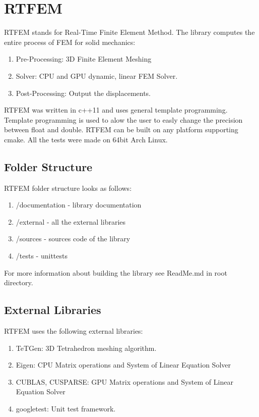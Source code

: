 \documentclass[en]{minipw} %
\begin{document}
\section{RTFEM}
RTFEM stands for Real-Time Finite Element Method. The library computes the entire process of FEM for solid mechanics:
\begin{enumerate}
\item Pre-Processing: 3D Finite Element Meshing
\item Solver: CPU and GPU dynamic, linear FEM Solver.
\item Post-Processing: Output the displacements.
\end{enumerate}

RTFEM was written in c++11 and uses general template programming. Template programming is used to alow the user to easly change the precision between float and double. RTFEM can be built on any platform supporting cmake. All the tests were made on 64bit Arch Linux.

\subsection{Folder Structure}
RTFEM folder structure looks as follows:
\begin{enumerate}
\item /documentation - library documentation
\item /external - all the external libraries
\item /sources - sources code of the library
\item /tests - unittests
\end{enumerate}
For more information about building the library see ReadMe.md in root directory.

\subsection{External Libraries}
RTFEM uses the following external libraries:
\begin{enumerate}
\item TeTGen: 3D Tetrahedron meshing algorithm.
\item Eigen: CPU Matrix operations and System of Linear Equation Solver
\item CUBLAS, CUSPARSE: GPU Matrix operations and System of Linear Equation Solver
\item googletest: Unit test framework.
\end{enumerate}
\end{document}
